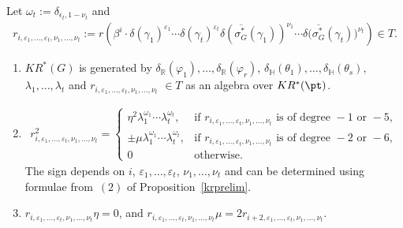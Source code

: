 \begin{Definition}
Let $\omega_t:=\delta_{\epsilon_t, 1-\nu_t}$ and
\begin{gather*}
r_{i, \varepsilon_1, \dots, \varepsilon_t, \nu_1, \dots,
\nu_t}:=r\left(\beta^i\cdot\delta(\gamma_1)^{\varepsilon_1}\cdots\delta(\gamma_t)^{\varepsilon_t}\delta(\overline{\sigma_G^*}
(\gamma_1))^{\nu_1}\cdots\delta\big(\overline{\sigma_G^*}(\gamma_t)\big)^{\nu_t}\right)\in T.
\end{gather*}
\end{Definition}
\begin{Corollary}\label{krglooseend}\quad
\begin{enumerate}\itemsep=0pt
\item[$1.$]
$KR^*(G)$ is generated by $\delta_\mathbb{R}(\varphi_1),  {\dots}, \delta_\mathbb{R}(\varphi_r)$,
$\delta_\mathbb{H}(\theta_1),  {\dots}, \delta_\mathbb{H}(\theta_s)$, $\lambda_1,  {\dots}, \lambda_t\!$ and $r_{i,
\varepsilon_1, {\dots}, \varepsilon_t, \nu_1, {\dots}, \nu_t}$ $\in T$ as an algebra over $KR^*(\pt)$.
\item[$2.$]
\begin{gather*}
r_{i, \varepsilon_1, \dots, \varepsilon_t, \nu_1, \dots, \nu_t}^2=
\begin{cases}
\eta^2\lambda_1^{\omega_1}\cdots\lambda_t^{\omega_t},
&\text{if }r_{i, \varepsilon_1, \dots, \varepsilon_t, \nu_1, \dots, \nu_t}\text{ is of degree }-1\text{ or }-5,
\\
\pm\mu\lambda_1^{\omega_1}\cdots\lambda_t^{\omega_t},
&\text{if }r_{i, \varepsilon_1, \dots, \varepsilon_t, \nu_1, \dots, \nu_t}\text{ is of degree }-2\text{ or }-6,
\\
0
&\text{otherwise}.
\end{cases}
\end{gather*}
The sign depends on $i$, $\varepsilon_1, \dots, \varepsilon_t$, $\nu_1, \dots, \nu_t$ and can be determined using formulae
from~$(2)$ of Proposition~{\rm \ref{krprelim}}.
\item[$3.$]
$r_{i, \varepsilon_1, \dots, \varepsilon_t, \nu_1, \dots, \nu_t}\eta=0$, and $r_{i, \varepsilon_1, \dots, \varepsilon_t,
\nu_1, \dots, \nu_t}\mu=2r_{i+2, \varepsilon_1, \dots, \varepsilon_t, \nu_1, \dots, \nu_t}$.
\end{enumerate}
\end{Corollary}

